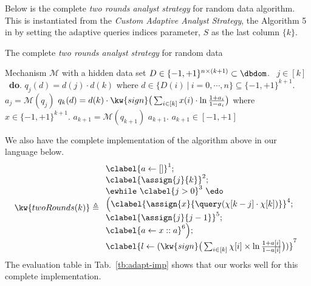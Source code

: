 
\begin{example}
    \label{ex:twoRoundsComplete}

Below is the complete \emph{two rounds analyst strategy} for random data algorithm. This is instantiated from the
\emph{Custom Adaptive Analyst Strategy}, the Algorithm 5 in \cite{RogersRSSTW20} by setting the adaptive queries indices parameter, $S$ as the last column $\{ k \}$.

\begin{algorithm}
    \caption{The complete \emph{two rounds analyst strategy} for random data}
    \label{alg:twoRound}
    \begin{algorithmic}
    \REQUIRE Mechanism $\mathcal{M}$ with a hidden data set $D \in \{-1,+1\}^{n\times (k+1)} \subset \dbdom$.
    \ $j\in [k]$\ {\bf do}.  
    \STATE {} $q_j(d)=d(j)\cdot d(k)$ where $d \in \{D(i) ~|~ i = 0, \cdots, n\} \subseteq \{-1,+1\}^{k+1}$.
    \STATE {} $a_j=\mathcal{M}(q_j)$ 
    \STATE \qquad {}
     $q_{k}(d)= d(k) \cdot \kw{sign}\big (\sum_{i\in [k]} x(i) \cdot \ln\frac{1+a_i}{1-a_i} \big )$ where $x\in \{-1,+1\}^{k+1}$.
    \STATE{}
     $a_{k+1}=\mathcal{M}(q_{k+1})$
    \STATE{}
    \RETURN $a_{k+1}$.
    \ENSURE $a_{k+1}\in [-1,+1]$
    \end{algorithmic}
    \end{algorithm}
%
We also have the complete implementation of the algorithm above in our language below.
\[
    \kw{twoRounds(k)} \triangleq
\begin{array}{l}
       \clabel{ a \leftarrow []}^{1} ; \\
        \clabel{\assign{j}{k} }^{2} ; \\
        \ewhile ~ \clabel{j > 0}^{3} ~ \edo ~ \\
        \Big(
         \clabel{\assign{x}{\query(\chi[k - j]\cdot \chi[k])} }^{4}  ; \\
         \clabel{\assign{j}{j-1}}^{5} ;\\
        \clabel{a \leftarrow x :: a}^{6}       \Big);\\
        \clabel{l \leftarrow (\kw{sign}\big (\sum_{i\in [k]} \chi[i]\times\ln\frac{1+a[i]}{1-a[i]} \big ))}^{7}\\
    \end{array}
\]
%
The evaluation table in Tab.~\ref{tb:adapt-imp} shows that our {\THESYSTEM} works well for this complete implementation.
    \end{example}